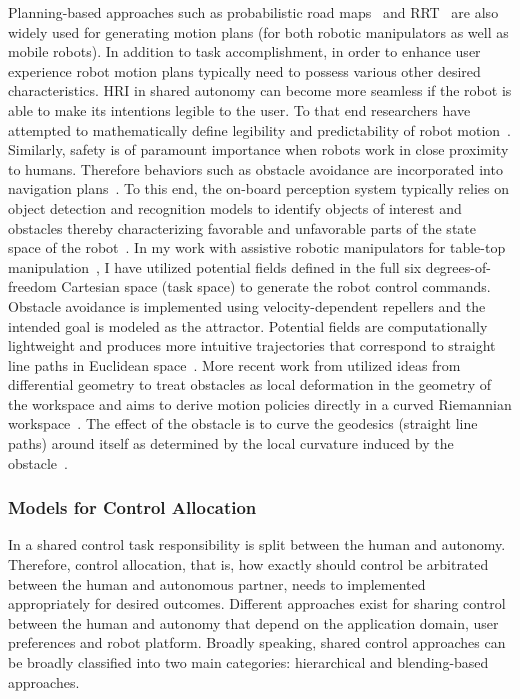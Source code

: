 \documentclass[12pt]{article}
\begin{document}
Planning-based approaches such as probabilistic road maps~\cite{kavraki1996analysis} and RRT~\cite{kuffner2000rrt} are also widely used for generating motion plans (for both robotic manipulators as well as mobile robots). In addition to task accomplishment, in order to enhance user experience robot motion plans typically need to possess various other desired characteristics. HRI in shared autonomy can become more seamless if the robot is able to make its intentions legible to the user. To that end researchers have attempted to mathematically define legibility and predictability of robot motion~\cite{dragan2013legibility}. Similarly, safety is of paramount importance when robots work in close proximity to humans. Therefore behaviors such as obstacle avoidance are incorporated into navigation plans~\cite{storms2014blending}. To this end, the on-board perception system typically relies on object detection and recognition models to identify objects of interest and obstacles thereby characterizing favorable and unfavorable parts of the state space of the robot~\cite{muller2006off}. In my work with assistive robotic manipulators for table-top manipulation~\cite{gopinath2017human}, I have utilized potential fields defined in the full six degrees-of-freedom Cartesian space (task space) to generate the robot control commands. Obstacle avoidance is implemented using velocity-dependent repellers and the intended goal is modeled as the attractor. Potential fields are computationally lightweight and produces more intuitive trajectories that correspond to straight line paths in Euclidean space~\cite{khatib1986real}. More recent work from utilized ideas from differential geometry to treat obstacles as local deformation in the geometry of the workspace and aims to derive motion policies directly in a curved Riemannian workspace~\cite{ratliff2018riemannian}. The effect of the obstacle is to curve the geodesics (straight line paths) around itself as determined by the local curvature induced by the obstacle~\cite{mainprice2016warping}. 
\subsubsection{Models for Control Allocation}

In a shared control task responsibility is split between the human and autonomy. Therefore, control allocation, that is, how exactly should control be arbitrated between the human and autonomous partner, needs to implemented appropriately for desired outcomes. Different approaches exist for sharing control between the human and autonomy that depend on the application domain, user preferences and robot platform. 
Broadly speaking, shared control approaches can be broadly classified into two main categories: hierarchical and blending-based approaches.
\end{document}
